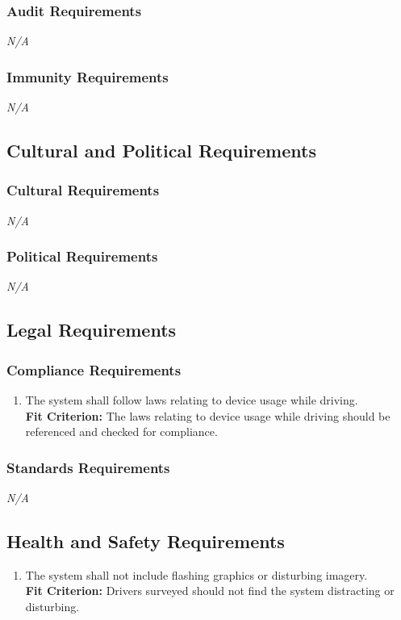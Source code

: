 \documentclass[12pt,letterpaper]{article}
\begin{document}
\subsubsection{Audit Requirements}
\noindent \emph{N/A}

\subsubsection{Immunity Requirements}
\noindent \emph{N/A}

\subsection{Cultural and Political Requirements}
\subsubsection{Cultural Requirements}
\noindent \emph{N/A}

\subsubsection{Political Requirements}
\noindent \emph{N/A}

\subsection{Legal Requirements}
\subsubsection{Compliance Requirements}
\begin{enumerate}[{LR}1.] 
    \item The system shall follow laws relating to device usage while driving.\\
    \textbf{Fit Criterion:} The laws relating to device usage while driving
    should be referenced and checked for compliance.
\end{enumerate}
\subsubsection{Standards Requirements}
\noindent \emph{N/A}

\subsection{Health and Safety Requirements}
\begin{enumerate}[{HS}1.] 
    \item The system shall not include flashing graphics or disturbing
    imagery.\\
    \textbf{Fit Criterion:} Drivers surveyed should not find the system
    distracting or disturbing.
\end{enumerate}
\end{document}
